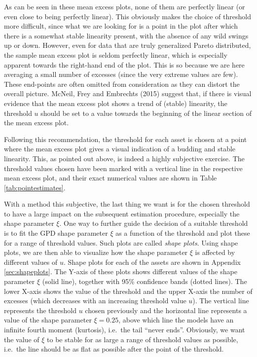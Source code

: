 \documentclass[a4paper,11pt]{article}
\theoremstyle{definition}
\theoremstyle{definition}
\theoremstyle{definition}
\theoremstyle{definition}
\theoremstyle{remark}
\begin{document}
As can be seen in these mean excess plots, none of them are perfectly linear (or even close to being perfectly linear). This obviously makes the choice of threshold more difficult, since what we are looking for is a point in the plot after which there is a somewhat stable linearity present, with the absence of any wild swings up or down. However, even for data that are truly generalized Pareto distributed, the sample mean excess plot is seldom perfectly linear, which is especially apparent towards the right-hand end of the plot. This is so because we are here averaging a small number of excesses (since the very extreme values are few). These end-points are often omitted from consideration as they can distort the overall picture. McNeil, Frey and Embrechts (2015) suggest that, if there is visual evidence that the mean excess plot shows a trend of (stable) linearity, the threshold \(u\) should be set to a value towards the beginning of the linear section of the mean excess plot.

Following this recommendation, the threshold for each asset is chosen at a point where the mean excess plot gives a visual indication of a budding and stable linearity. This, as pointed out above, is indeed a highly subjective exercise. The threshold values chosen have been marked with a vertical line in the respective mean excess plot, and their exact numerical values are shown in Table \ref{tab:pointestimates}.

With a method this subjective, the last thing we want is for the chosen threshold to have a large impact on the subsequent estimation procedure, especially the shape parameter \(\xi\). One way to further guide the decision of a suitable threshold is to fit the GPD shape parameter \(\xi\) as a function of the threshold and plot these for a range of threshold values. Such plots are called \emph{shape plots}. Using shape plots, we are then able to visualize how the shape parameter \(\xi\) is affected by different values of \(u\). Shape plots for each of the assets are shown in Appendix \ref{sec:shapeplots}. The Y-axis of these plots shows different values of the shape parameter \(\xi\) (solid line), together with 95\% confidence bands (dotted lines). The lower X-axis shows the value of the threshold and the upper X-axis the number of excesses (which decreases with an increasing threshold value \(u\)). The vertical line represents the threshold \(u\) chosen previously and the horizontal line represents a value of the shape parameter \(\xi = 0.25\), above which line the models have an infinite fourth moment (kurtosis), i.e.~the tail ``never ends''. Obviously, we want the value of \(\xi\) to be stable for as large a range of threshold values as possible, i.e.~the line should be as flat as possible after the point of the threshold.
\end{document}
